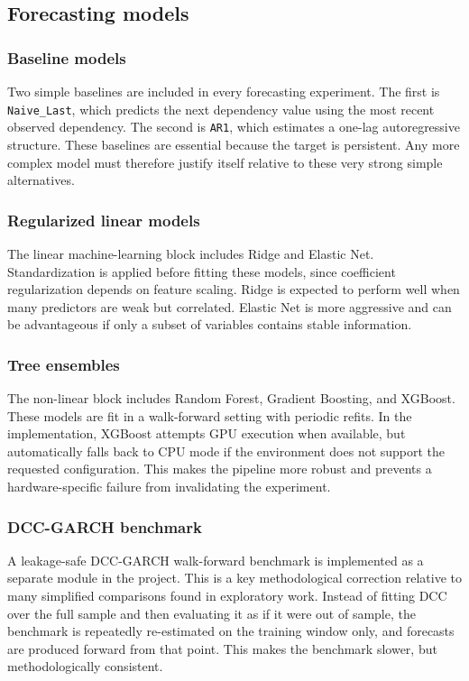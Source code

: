 \subsection{Forecasting models}

\subsubsection{Baseline models}

Two simple baselines are included in every forecasting experiment. The first is \texttt{Naive\_Last}, which predicts the next dependency value using the most recent observed dependency. The second is \texttt{AR1}, which estimates a one-lag autoregressive structure. These baselines are essential because the target is persistent. Any more complex model must therefore justify itself relative to these very strong simple alternatives.

\subsubsection{Regularized linear models}

The linear machine-learning block includes Ridge and Elastic Net. Standardization is applied before fitting these models, since coefficient regularization depends on feature scaling. Ridge is expected to perform well when many predictors are weak but correlated. Elastic Net is more aggressive and can be advantageous if only a subset of variables contains stable information.

\subsubsection{Tree ensembles}

The non-linear block includes Random Forest, Gradient Boosting, and XGBoost. These models are fit in a walk-forward setting with periodic refits. In the implementation, XGBoost attempts GPU execution when available, but automatically falls back to CPU mode if the environment does not support the requested configuration. This makes the pipeline more robust and prevents a hardware-specific failure from invalidating the experiment.

\subsubsection{DCC-GARCH benchmark}

A leakage-safe DCC-GARCH walk-forward benchmark is implemented as a separate module in the project. This is a key methodological correction relative to many simplified comparisons found in exploratory work. Instead of fitting DCC over the full sample and then evaluating it as if it were out of sample, the benchmark is repeatedly re-estimated on the training window only, and forecasts are produced forward from that point. This makes the benchmark slower, but methodologically consistent.

